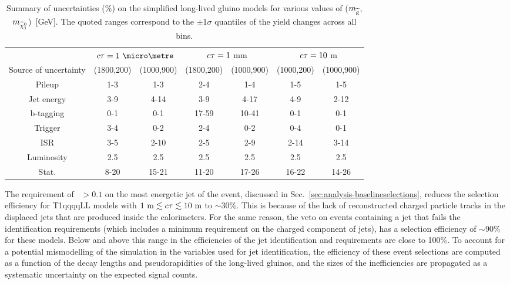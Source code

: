\begin{table}[t]
\centering
\footnotesize
\begin{tabular}{c|cc|cc|cc}
\hline
& \multicolumn{2}{c|}{$\ctau=1~\micro\metre$} & \multicolumn{2}{c|}{$c\tau=1$ 
mm} & \multicolumn{2}{c}{$c\tau=10$ m} \\
Source of uncertainty & (1800,200) & (1000,900) & (1800,200) & 
(1000,900) & (1000,200) & (1000,900) \\   
\hline
Pileup & 1-3 & 1-3 & 2-4 & 1-4 & 1-5 & 1-5 \\
Jet energy & 3-9 & 4-14 & 3-9 & 4-17 & 4-9 & 2-12 \\
b-tagging & 0-1 & 0-1 & 17-59 & 10-41 & 0-1 & 0-1 \\
Trigger & 3-4 & 0-2 & 2-4 & 0-2 & 0-4 & 0-1 \\
ISR & 3-5 & 2-10 & 2-5 & 2-9 & 2-14 & 3-14 \\
Luminosity & 2.5 & 2.5 & 2.5 & 2.5 & 2.5 & 2.5 \\
Stat. & 8-20 & 15-21 & 11-20 & 17-26 & 16-22 & 14-26 \\
\hline
\end{tabular}
\caption{Summary of uncertainties (\%) on the simplified long-lived gluino 
models for various values of ($m_{\mathrm{\widetilde{g}}}$,$m_{\widetilde{\chi}_1^0}$)~[GeV]. The 
quoted ranges correspond to the $\pm1\sigma$ quantiles of the yield changes 
across all \njnbhtmht bins.}
\label{tab:systs-signal}
\end{table}


The requirement of \chf~$>0.1$ on the most energetic jet of the event, 
discussed in Sec.~\ref{sec:analysis-baselineselections}, reduces the selection 
efficiency for T1qqqqLL models with $1~\mathrm{m} \lesssim c\tau \lesssim 
10~\mathrm{m}$ to $\sim$30\%. This is because of the lack of reconstructed 
charged particle tracks in the displaced jets that are produced inside the 
calorimeters. 
For the same reason, the veto on events containing a jet that fails the 
identification requirements (which includes a minimum requirement on the 
charged component of jets), has a selection efficiency of $\sim$90\% for these 
models.
Below and above this range in \ctau the efficiencies of the jet identification 
and \chf requirements are close to 100\%.
To account for a potential mismodelling of the simulation in the variables used 
for jet identification, the efficiency of these event selections are computed 
as a function of the decay lengths and pseudorapidities of the long-lived 
gluinos, and the sizes of the inefficiencies are propagated as a systematic 
uncertainty on the expected signal counts. 


